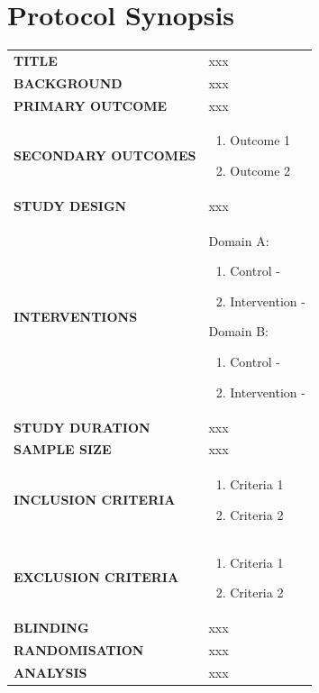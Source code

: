 \documentclass[
  11pt,
]{article}
\begin{document}
\clearpage

\hypertarget{protocol-synopsis}{%
\section{Protocol Synopsis}\label{protocol-synopsis}}

\begin{longtable}{>{}l>{\raggedright\arraybackslash}p{10cm}}
\toprule
\textbf{TITLE} & xxx\\
\textbf{BACKGROUND} & xxx\\
\textbf{PRIMARY OUTCOME} & xxx\\
\textbf{SECONDARY OUTCOMES} & \begin{enumerate}[leftmargin=0cm,itemindent=.5cm,labelindent=0pt,nosep]\item Outcome 1\item Outcome 2\end{enumerate}\\
\textbf{STUDY DESIGN} & xxx\\
\addlinespace
\textbf{INTERVENTIONS} & Domain A:\begin{enumerate}\item Control - \item Intervention - \end{enumerate}Domain B:\begin{enumerate}[nolistsep]\item Control - \item Intervention - \end{enumerate}\\
\textbf{STUDY DURATION} & xxx\\
\textbf{SAMPLE SIZE} & xxx\\
\textbf{INCLUSION CRITERIA} & \begin{enumerate}[leftmargin=0cm,itemindent=.5cm,labelindent=0pt,nosep]\item Criteria 1\item Criteria 2\end{enumerate}\\
\textbf{EXCLUSION CRITERIA} & \begin{enumerate}[leftmargin=0cm,itemindent=.5cm,labelindent=0pt,nosep]\item Criteria 1\item Criteria 2\end{enumerate}\\
\addlinespace
\textbf{BLINDING} & xxx\\
\textbf{RANDOMISATION} & xxx\\
\textbf{ANALYSIS} & xxx\\
\bottomrule
\end{longtable}
\end{document}
